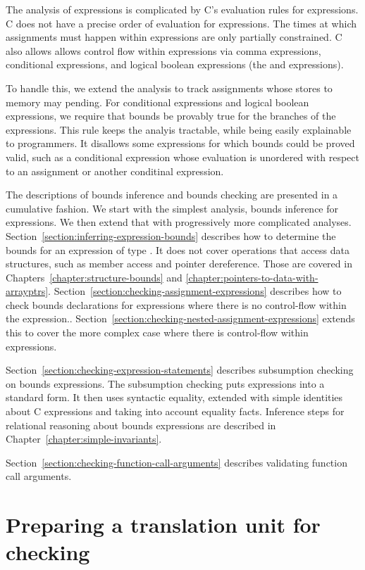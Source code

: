 The analysis of expressions is complicated by C's evaluation
rules for expressions.  C does not have a precise order of evaluation
for expressions.  The times at which assignments
must happen within expressions are only partially constrained.
C also allows allows control flow within 
expressions  via comma expressions,   conditional expressions, and
logical boolean expressions (the \code{&&} and \code{||} expressions).

To handle this, we extend the analysis to track assignments
whose stores to memory may pending.  For conditional expressions
and logical boolean expressions, we require that bounds be provably
true for the branches of the expressions. This rule keeps the analyis
tractable, while being easily explainable to programmers.  It disallows
some expressions for which bounds could be proved valid, such as 
a conditional expression whose evaluation is unordered with respect
to an assignment or another conditinal expression.

The descriptions of bounds inference and bounds checking are
presented in a cumulative fashion.  We start with the simplest
analysis, bounds inference for expressions.  We then extend that
with progressively more complicated analyses.
Section~\ref{section:inferring-expression-bounds}
describes how to determine the bounds for an expression of type \arrayptr.
It does not cover operations that access data structures, such as member
access and pointer dereference. 
Those are covered in Chapters~\ref{chapter:structure-bounds} and 
\ref{chapter:pointers-to-data-with-arrayptrs}.
Section~\ref{section:checking-assignment-expressions} describes
how to check bounds declarations for expressions where there is
no control-flow within the expression..
Section~\ref{section:checking-nested-assignment-expressions}
extends this to cover the more complex case where there is control-flow
within expressions.

Section~\ref{section:checking-expression-statements} describes
subsumption checking on bounds expressions.   The subsumption checking
puts expressions into a standard form.  It then uses syntactic equality,
extended with simple identities about C expressions and taking into account equality facts.
Inference steps for relational reasoning about bounds expressions 
are described in Chapter~\ref{chapter:simple-invariants}.

Section~\ref{section:checking-function-call-arguments}
describes validating function call arguments.

\section{Preparing a translation unit for checking}

